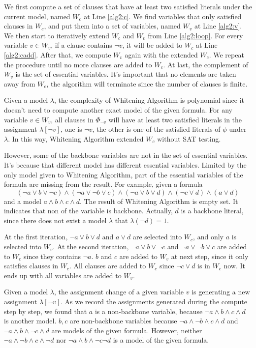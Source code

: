 We first compute a set of clauses that have at least two satisfied literals under the current model, named $W_c$ at Line \ref{alg2:c}. We find variables that only satisfied clauses in $W_c$, and put them into a set of variables, named $W_v$ at Line \ref{alg2:v}. We then start to iteratively extend $W_c$ and $W_v$ from Line \ref{alg2:loop}. For every variable $v\in W_v$, if a clause contains $\neg v$, it will be added to $W_c$ at Line \ref{alg2:cadd}. After that, we compute $W_v$ again with the extended $W_c$. We repeat the procedure until no more clauses are added to $W_c$. At last, the complement of $W_v$ is the set of essential variables. It's important that no elements are taken away from $W_c$, the algorithm will terminate since the number of clauses is finite.

Given a model $\lambda$, the complexity of Whitening Algorithm is polynomial since it doesn't need to compute another exact model of the given formula. For any variable $v\in W_v$, all clauses in $\Phi_{\neg v}$ will have at least two satisfied literals in the assignment $\lambda[\neg v]$, one is $\neg v$, the other is one of the satisfied literals of $\phi$ under $\lambda$. In this way, Whitening Algorithm extended $W_c$ without SAT testing.

However, some of the backbone variables are not in the set of essential variables. It's because that different model has different essential variables. Limited by the only model given to Whitening Algorithm, part of the essential variables of the formula are missing from the result. For example, given a formula
\[(\neg a\vee b\vee\neg c)\wedge(\neg a\vee\neg b\vee c)\wedge(\neg a\vee b\vee d)\wedge(\neg c\vee d)\wedge(a\vee d)\]
and a model $a\wedge b\wedge c\wedge d$. The result of Whitening Algorithm is empty set. It indicates that non of the variable is backbone. Actually, $d$ is a backbone literal, since there does not exist a model $\lambda$ that $\lambda(\neg d)=1$.

At the first iteration, $\neg a\vee b\vee d$ and $a\vee d$ are selected into $W_c$, and only $a$ is selected into $W_v$. At the second iteration, $\neg a\vee b\vee \neg c$ and $\neg a\vee\neg b\vee c$ are added to $W_c$ since they contains $\neg a$. $b$ and $c$ are added to $W_v$ at next step, since it only satisfies clauses in $W_c$. All clauses are added to $W_c$ since $\neg c\vee d$ is in $W_c$ now. It ends up with all variables are added to $W_v$.

Given a model $\lambda$, the assignment change of a given variable $v$ is generating a new assignment $\lambda[\neg v]$. As we record the assignments generated during the compute step by step, we found that $a$ is a non-backbone variable, because $\neg a\wedge b\wedge c\wedge d$ is another model. $b,c$ are non-backbone variables because $\neg a\wedge \neg b\wedge c\wedge d$ and $\neg a\wedge b\wedge \neg c\wedge d$ are models of the given formula. However, neither $\neg a\wedge \neg b\wedge c\wedge \neg d$ nor $\neg a\wedge b\wedge \neg c\neg d$ is a model of the given formula.


